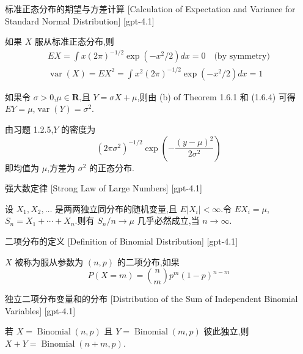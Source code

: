 \documentclass[UTF8]{ctexart}
\begin{document}
    
    
    \begin{xmp}
        {标准正态分布的期望与方差计算}
        [Calculation of Expectation and Variance for Standard Normal Distribution]
        [gpt-4.1]
        
如果 $X$ 服从标准正态分布,则
\[
\begin{array}{l}
E X = \displaystyle \int x (2 \pi)^{-1/2} \exp(-x^{2}/2) dx = 0 \quad \text{(by symmetry)} \\
\operatorname{var}(X) = E X^{2} = \displaystyle \int x^{2} (2 \pi)^{-1/2} \exp(-x^{2}/2) dx = 1
\end{array}
\]

如果令 $\sigma > 0$,$\mu \in \mathbf{R}$,且 $Y = \sigma X + \mu$,则由 (b) of Theorem 1.6.1 和 (1.6.4) 可得 $E Y = \mu$,$\operatorname{var}(Y) = \sigma^{2}$.

由习题 1.2.5,$Y$ 的密度为
\[
(2\pi \sigma^{2})^{-1/2} \exp\left( -\frac{(y-\mu)^{2}}{2\sigma^{2}} \right)
\]
即均值为 $\mu$,方差为 $\sigma^{2}$ 的正态分布.

    \end{xmp}
    
    
    
    \begin{thm}
        {强大数定律}
        [Strong Law of Large Numbers]
        [gpt-4.1]
        
设 $X_{1}, X_{2}, \dots$ 是两两独立同分布的随机变量,且 $E|X_{i}| < \infty$.令 $E X_{i} = \mu$,$S_{n} = X_{1} + \cdots + X_{n}$.则有 $S_{n}/n \to \mu$ 几乎必然成立,当 $n \to \infty$.

    \end{thm}
    
    
    
    \begin{dfn}
        {二项分布的定义}
        [Definition of Binomial Distribution]
        [gpt-4.1]
        
$X$ 被称为服从参数为 $(n, p)$ 的二项分布,如果
\[
P(X = m) = \binom{n}{m} p^m (1-p)^{n-m}
\]

    \end{dfn}
    
    
    
    \begin{thm}
        {独立二项分布变量和的分布}
        [Distribution of the Sum of Independent Binomial Variables]
        [gpt-4.1]
        
若 $X = \operatorname{Binomial}(n, p)$ 且 $Y = \operatorname{Binomial}(m, p)$ 彼此独立,则 $X + Y = \operatorname{Binomial}(n+m, p)$.

    \end{thm}
    
\end{document}
